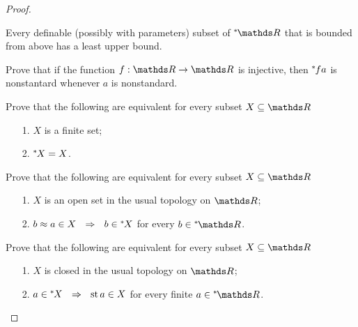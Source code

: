 \begin{proof}

\begin{exercise}\label{ex_dedekindcomplete}
  Every definable (possibly with parameters) subset of $\nsR$ that is bounded from above has a least upper bound.
\end{exercise}

\begin{exercise}
Prove that if the function $f:\RR\to\RR$ is injective, then  ${}^*\kern-.2ex f a$ is nonstantard whenever $a$ is nonstandard.
\end{exercise}

\begin{exercise}
Prove that the following are equivalent for every subset $X\subseteq\RR$\nobreak
\begin{itemize}
\item[1.]  $X$ is a finite set;
\item[2.]  ${}^*\kern-.2ex X=X$.
\end{itemize}
\end{exercise}

\begin{exercise}\label{ex_open_nstd}
Prove that the following are equivalent for every subset $X\subseteq\RR$\nobreak
\begin{itemize}
\item[1.]  $X$ is an open set in the usual topology on $\RR$;
\item[2.]  $b\approx a\in X \ \ \Rightarrow\ \ b\in{}^*\kern-.2ex X$ for every $b\in\nsR$.
\end{itemize}
\end{exercise}

\begin{exercise}\label{ex_closed_nstd}
Prove that the following are equivalent for every subset $X\subseteq\RR$\nobreak
\begin{itemize}
\item[1.]  $X$ is closed in the usual topology on $\RR$;
\item[2.]  $a\in{}^*\kern-.2ex X \ \ \Rightarrow\ \ {\rm st}\, a\in X$ for every finite $a\in\nsR$.
\end{itemize}
\end{exercise}



\end{proof}
